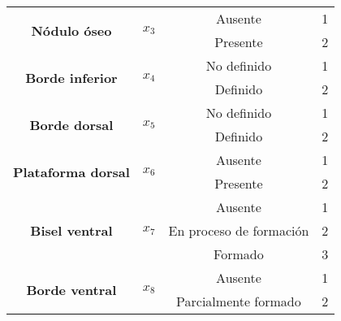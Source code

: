 \begin{table}[H]
{\begin{tabular}{|c|c|c|c|}
\multirow{2}{*}{\textbf{Nódulo óseo}}                 & \multirow{2}{*}{$x_3$}     & Ausente                         & 1                                \\ \cline{3-4}
                                                      &                            & Presente                        & 2                                \\ \hline
\multirow{2}{*}{\textbf{Borde inferior}}              & \multirow{2}{*}{$x_4$}     & No definido                     & 1                                \\ \cline{3-4}
                                                      &                            & Definido                        & 2                                \\ \hline
\multirow{2}{*}{\textbf{Borde dorsal}}                & \multirow{2}{*}{$x_5$}     & No definido                     & 1                                \\ \cline{3-4}
                                                      &                            & Definido                        & 2                                \\ \hline
\multirow{2}{*}{\textbf{Plataforma dorsal}}           & \multirow{2}{*}{$x_6$}     & Ausente                         & 1                                \\ \cline{3-4}
                                                      &                            & Presente                        & 2                                \\ \hline
\multirow{3}{*}{\textbf{Bisel ventral}}               & \multirow{3}{*}{$x_7$}     & Ausente                         & 1                                \\ \cline{3-4}
                                                      &                            & En proceso de formación         & 2                                \\ \cline{3-4}
                                                      &                            & Formado                         & 3                                \\ \hline
\multirow{5}{*}{\textbf{Borde ventral}}               & \multirow{5}{*}{$x_8$}     & Ausente                         & 1                                \\ \cline{3-4}
                                                      &                            & Parcialmente formado            & 2                                \\ \cline{3-4}

\end{tabular}}
\end{table}
